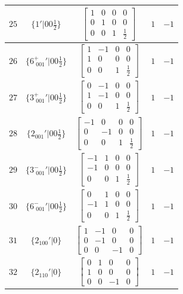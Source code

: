 \documentclass[fleqn,8pt]{jsarticle}
\begin{document}
\begin{longtable}{ccccc}
$ 25 $ & $ \{1{}'|0 0 \frac{1}{2}\} $ & $ \begin{bmatrix} 1 & 0 & 0 & 0 \\ 0 & 1 & 0 & 0 \\ 0 & 0 & 1 & \frac{1}{2} \end{bmatrix} $ & $ 1 $ & $ -1 $ \\ \hline
$ 26 $ & $ \{6^{+}_{\,\,001}{}'|0 0 \frac{1}{2}\} $ & $ \begin{bmatrix} 1 & -1 & 0 & 0 \\ 1 & 0 & 0 & 0 \\ 0 & 0 & 1 & \frac{1}{2} \end{bmatrix} $ & $ 1 $ & $ -1 $ \\ \hline
$ 27 $ & $ \{3^{+}_{\,\,001}{}'|0 0 \frac{1}{2}\} $ & $ \begin{bmatrix} 0 & -1 & 0 & 0 \\ 1 & -1 & 0 & 0 \\ 0 & 0 & 1 & \frac{1}{2} \end{bmatrix} $ & $ 1 $ & $ -1 $ \\ \hline
$ 28 $ & $ \{2{}_{001}{}'|0 0 \frac{1}{2}\} $ & $ \begin{bmatrix} -1 & 0 & 0 & 0 \\ 0 & -1 & 0 & 0 \\ 0 & 0 & 1 & \frac{1}{2} \end{bmatrix} $ & $ 1 $ & $ -1 $ \\ \hline
$ 29 $ & $ \{3^{-}_{\,\,001}{}'|0 0 \frac{1}{2}\} $ & $ \begin{bmatrix} -1 & 1 & 0 & 0 \\ -1 & 0 & 0 & 0 \\ 0 & 0 & 1 & \frac{1}{2} \end{bmatrix} $ & $ 1 $ & $ -1 $ \\ \hline
$ 30 $ & $ \{6^{-}_{\,\,001}{}'|0 0 \frac{1}{2}\} $ & $ \begin{bmatrix} 0 & 1 & 0 & 0 \\ -1 & 1 & 0 & 0 \\ 0 & 0 & 1 & \frac{1}{2} \end{bmatrix} $ & $ 1 $ & $ -1 $ \\ \hline
$ 31 $ & $ \{2{}_{100}{}'|0\} $ & $ \begin{bmatrix} 1 & -1 & 0 & 0 \\ 0 & -1 & 0 & 0 \\ 0 & 0 & -1 & 0 \end{bmatrix} $ & $ 1 $ & $ -1 $ \\ \hline
$ 32 $ & $ \{2{}_{110}{}'|0\} $ & $ \begin{bmatrix} 0 & 1 & 0 & 0 \\ 1 & 0 & 0 & 0 \\ 0 & 0 & -1 & 0 \end{bmatrix} $ & $ 1 $ & $ -1 $ \\ \hline

\end{longtable}
\end{document}
